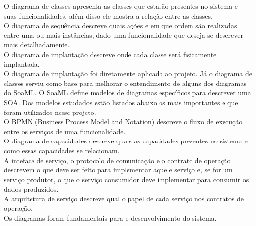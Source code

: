 \documentclass{article}
\begin{document}
O diagrama de classes apresenta as classes que estarão presentes no sistema e suas funcionalidades, além disso ele mostra a relação entre as classes.\\
O diagrama de sequência descreve quais ações e em que ordem são realizadas entre uma ou mais instâncias, dado uma funcionalidade que deseja-se descrever mais detalhadamente.\\
O diagrama de implantação descreve onde cada classe será fisicamente implantada.\\
O diagrama de implantação foi diretamente aplicado ao projeto. Já o diagrama de classes serviu como base para melhorar o entendimento de alguns dos diagramas do SoaML. O SoaML define modelos de diagramas específicos para descrever uma SOA. Dos modelos estudados estão listados abaixo os mais importantes e que foram utilizados nesse projeto.\\
O BPMN (Business Process Model and Notation) descreve o fluxo de execução entre os serviços de uma funcionalidade.\\
O diagrama de capacidades descreve quais as capacidades presentes no sistema e como essas capacidades se relacionam.\\
A inteface de serviço, o protocolo de comunicação e o contrato de operação descrevem o que deve ser feito para implementar aquele serviço e, se for um serviço produtor, o que o serviço consumidor deve implementar para consumir os dados produzidos.\\
A arquitetura de serviço descreve qual o papel de cada serviço nos contratos de operação.\\
Os diagramas foram fundamentais para o desenvolvimento do sistema.\\
\end{document}
